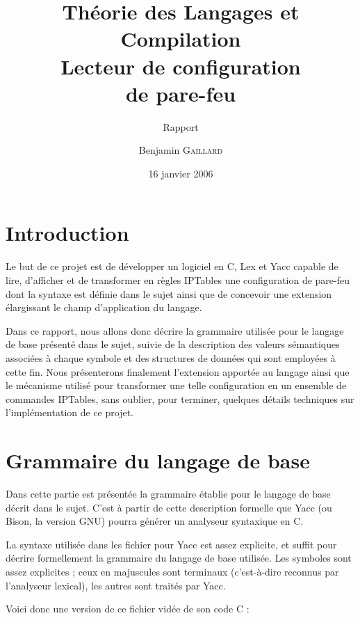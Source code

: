 \documentclass[a4paper,11pt]{report}
\title{%
  {\large Théorie des Langages et Compilation}\\
  Lecteur de configuration\\de pare-feu%
}
\subtitle{Rapport}
\author{Benjamin \textsc{Gaillard}}
\date{16 janvier 2006}
\begin{document}

\maketitle
\tableofcontents

\chapter*{Introduction}

Le but de ce projet est de développer un logiciel en C, Lex et Yacc capable de
lire, d'afficher et de transformer en règles IPTables une configuration de
pare-feu dont la syntaxe est définie dans le sujet ainsi que de concevoir une
extension élargissant le champ d'application du langage.

Dans ce rapport, nous allons donc décrire la grammaire utilisée pour le
langage de base présenté dans le sujet, suivie de la description des valeurs
sémantiques associées à chaque symbole et des structures de données qui sont
employées à cette fin. Nous présenterons finalement l'extension apportée au
langage ainsi que le mécanisme utilisé pour transformer une telle
configuration en un ensemble de commandes IPTables, sans oublier, pour
terminer, quelques détails techniques sur l'implémentation de ce projet.

\chapter{Grammaire du langage de base}

\begin{intro}
  Dans cette partie est présentée la grammaire établie pour le langage de base
  décrit dans le sujet. C'est à partir de cette description formelle que Yacc
  (ou Bison, la version GNU) pourra générer un analyseur syntaxique en C.
\end{intro}

La syntaxe utilisée dans les fichier pour Yacc est assez explicite, et suffit
pour décrire formellement la grammaire du langage de base utilisée. Les
symboles sont assez explicites ; ceux en majuscules sont terminaux
(c'est-à-dire reconnus par l'analyseur lexical), les autres sont traités par
Yacc.

Voici donc une version de ce fichier vidée de son code C :
\end{document}
